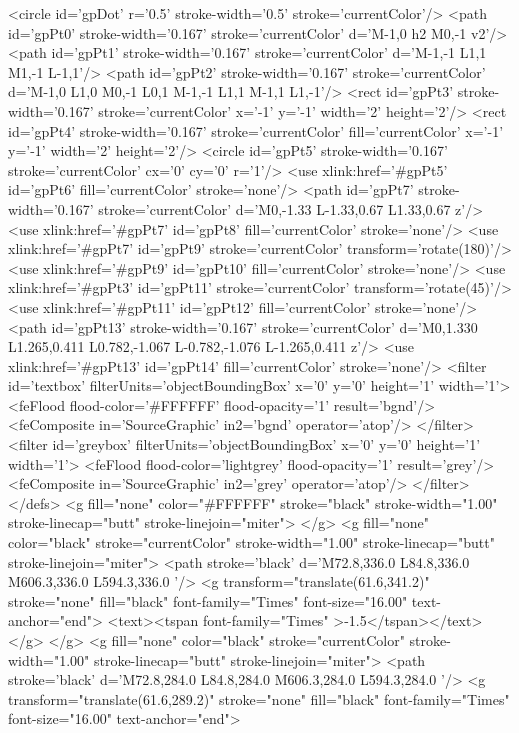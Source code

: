 	<circle id='gpDot' r='0.5' stroke-width='0.5' stroke='currentColor'/>
	<path id='gpPt0' stroke-width='0.167' stroke='currentColor' d='M-1,0 h2 M0,-1 v2'/>
	<path id='gpPt1' stroke-width='0.167' stroke='currentColor' d='M-1,-1 L1,1 M1,-1 L-1,1'/>
	<path id='gpPt2' stroke-width='0.167' stroke='currentColor' d='M-1,0 L1,0 M0,-1 L0,1 M-1,-1 L1,1 M-1,1 L1,-1'/>
	<rect id='gpPt3' stroke-width='0.167' stroke='currentColor' x='-1' y='-1' width='2' height='2'/>
	<rect id='gpPt4' stroke-width='0.167' stroke='currentColor' fill='currentColor' x='-1' y='-1' width='2' height='2'/>
	<circle id='gpPt5' stroke-width='0.167' stroke='currentColor' cx='0' cy='0' r='1'/>
	<use xlink:href='#gpPt5' id='gpPt6' fill='currentColor' stroke='none'/>
	<path id='gpPt7' stroke-width='0.167' stroke='currentColor' d='M0,-1.33 L-1.33,0.67 L1.33,0.67 z'/>
	<use xlink:href='#gpPt7' id='gpPt8' fill='currentColor' stroke='none'/>
	<use xlink:href='#gpPt7' id='gpPt9' stroke='currentColor' transform='rotate(180)'/>
	<use xlink:href='#gpPt9' id='gpPt10' fill='currentColor' stroke='none'/>
	<use xlink:href='#gpPt3' id='gpPt11' stroke='currentColor' transform='rotate(45)'/>
	<use xlink:href='#gpPt11' id='gpPt12' fill='currentColor' stroke='none'/>
	<path id='gpPt13' stroke-width='0.167' stroke='currentColor' d='M0,1.330 L1.265,0.411 L0.782,-1.067 L-0.782,-1.076 L-1.265,0.411 z'/>
	<use xlink:href='#gpPt13' id='gpPt14' fill='currentColor' stroke='none'/>
	<filter id='textbox' filterUnits='objectBoundingBox' x='0' y='0' height='1' width='1'>
	  <feFlood flood-color='#FFFFFF' flood-opacity='1' result='bgnd'/>
	  <feComposite in='SourceGraphic' in2='bgnd' operator='atop'/>
	</filter>
	<filter id='greybox' filterUnits='objectBoundingBox' x='0' y='0' height='1' width='1'>
	  <feFlood flood-color='lightgrey' flood-opacity='1' result='grey'/>
	  <feComposite in='SourceGraphic' in2='grey' operator='atop'/>
	</filter>
</defs>
<g fill="none" color="#FFFFFF" stroke="black" stroke-width="1.00" stroke-linecap="butt" stroke-linejoin="miter">
</g>
<g fill="none" color="black" stroke="currentColor" stroke-width="1.00" stroke-linecap="butt" stroke-linejoin="miter">
	<path stroke='black'  d='M72.8,336.0 L84.8,336.0 M606.3,336.0 L594.3,336.0  '/>	<g transform="translate(61.6,341.2)" stroke="none" fill="black" font-family="Times" font-size="16.00"  text-anchor="end">
		<text><tspan font-family="Times" >-1.5</tspan></text>
	</g>
</g>
<g fill="none" color="black" stroke="currentColor" stroke-width="1.00" stroke-linecap="butt" stroke-linejoin="miter">
	<path stroke='black'  d='M72.8,284.0 L84.8,284.0 M606.3,284.0 L594.3,284.0  '/>	<g transform="translate(61.6,289.2)" stroke="none" fill="black" font-family="Times" font-size="16.00"  text-anchor="end">
